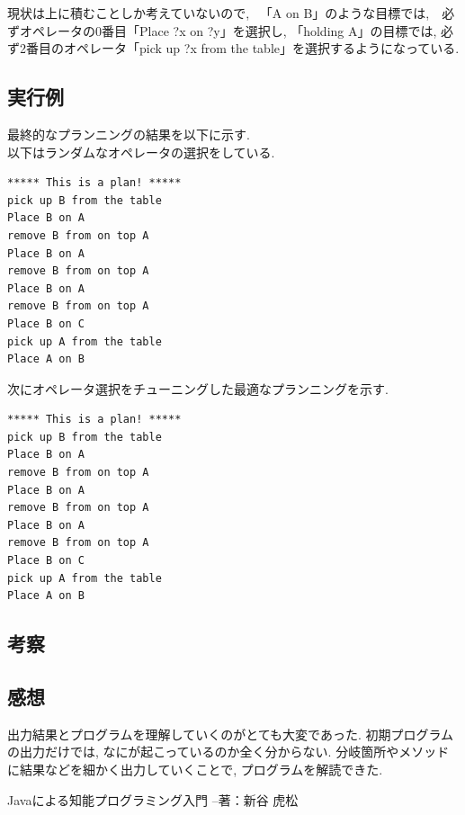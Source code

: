 \documentclass[uplatex,12pt]{jsarticle}
\begin{document}
現状は上に積むことしか考えていないので, 　「A on B」のような目標では,　必ずオペレータの0番目「Place ?x on ?y」を選択し, 「holding A」の目標では, 必ず2番目のオペレータ「pick up ?x from the table」を選択するようになっている.

\subsection{実行例}
最終的なプランニングの結果を以下に示す.\\
以下はランダムなオペレータの選択をしている.
\begin{lstlisting}
***** This is a plan! *****
pick up B from the table
Place B on A
remove B from on top A
Place B on A
remove B from on top A
Place B on A
remove B from on top A
Place B on C
pick up A from the table
Place A on B
\end{lstlisting}

次にオペレータ選択をチューニングした最適なプランニングを示す.
\begin{lstlisting}
***** This is a plan! *****
pick up B from the table
Place B on A
remove B from on top A
Place B on A
remove B from on top A
Place B on A
remove B from on top A
Place B on C
pick up A from the table
Place A on B
\end{lstlisting}

\subsection{考察}

\subsection{感想}
出力結果とプログラムを理解していくのがとても大変であった. 初期プログラムの出力だけでは, なにが起こっているのか全く分からない. 分岐箇所やメソッドに結果などを細かく出力していくことで, プログラムを解読できた.

\begin{thebibliography}{99}
 Javaによる知能プログラミング入門 --著：新谷 虎松 \\
\end{thebibliography}
\end{document}
